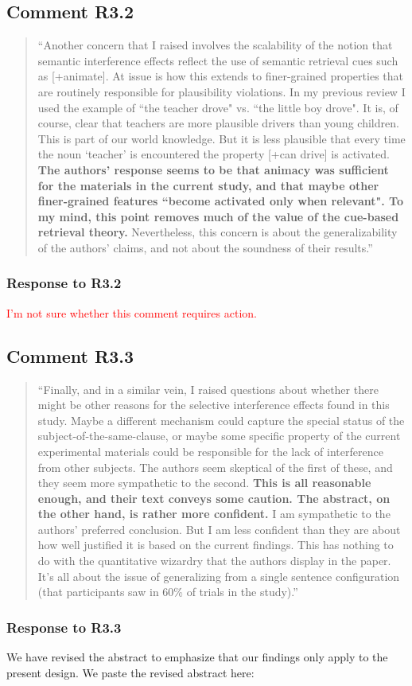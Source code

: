 \documentclass[12pt]{article}
\begin{document}
\subsection*{Comment R3.2}
\begin{quote}
``Another concern that I raised involves the scalability of the notion that semantic interference effects reflect the use of semantic retrieval cues such as [+animate]. At issue is how this extends to finer-grained properties that are routinely responsible for plausibility violations. In my previous review I used the example of ``the teacher drove" vs. ``the little boy drove". It is, of course, clear that teachers are more plausible drivers than young children. This is part of our world knowledge. But it is less plausible that every time the noun `teacher' is encountered the property [+can drive] is activated. \textbf{The authors' response seems to be that animacy was sufficient for the materials in the current study, and that maybe other finer-grained features ``become activated only when relevant". To my mind, this point removes much of the value of the cue-based retrieval theory.} Nevertheless, this concern is about the generalizability of the authors' claims, and not about the soundness of their results.''
\end{quote}
\subsubsection*{Response to R3.2}
\textcolor{red}{I'm not sure whether this comment requires action.}

\subsection*{Comment R3.3}
\begin{quote}
``Finally, and in a similar vein, I raised questions about whether there might be other reasons for the selective interference effects found in this study. Maybe a different mechanism could capture the special status of the subject-of-the-same-clause, or maybe some specific property of the current experimental materials could be responsible for the lack of interference from other subjects. The authors seem skeptical of the first of these, and they seem more sympathetic to the second. \textbf{This is all reasonable enough, and their text conveys some caution. The abstract, on the other hand, is rather more confident.} I am sympathetic to the authors' preferred conclusion. But I am less confident than they are about how well justified it is based on the current findings. This has nothing to do with the quantitative wizardry that the authors display in the paper. It's all about the issue of generalizing from a single sentence configuration (that participants saw in 60\% of trials in the study).''
\end{quote}

\subsubsection*{Response to R3.3}
We have revised the abstract to emphasize that our findings only apply to the present design. We paste the revised abstract here:

\begin{quote}
\end{quote}
\end{document}
